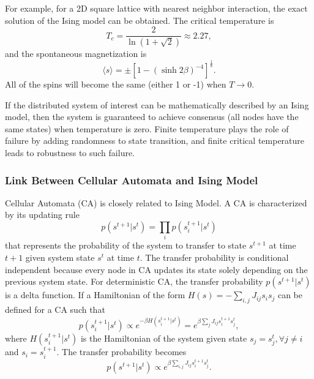 \documentclass[reprint,pre,aps]{revtex4-1}
\begin{document}
For example, for a 2D square lattice with nearest neighbor interaction, the exact solution of the Ising model can be obtained. The critical temperature is
\begin{equation}
T_c = \frac{2}{\ln(1 + \sqrt{2})} \approx 2.27,
\end{equation}
and the spontaneous magnetization is
\begin{equation}
\langle s \rangle = \pm \left[ 1 - (\sinh{2\beta})^{-4} \right]^{\frac{1}{8}}.
\end{equation}
All of the spins will become the same (either 1 or -1) when $T \to 0$.

If the distributed system of interest can be mathematically described by an Ising model, then the system is guaranteed to achieve consensus (all nodes have the same states) when temperature is zero. Finite temperature plays the role of failure by adding randomness to state transition, and finite critical temperature leads to robustness to such failure.

\subsubsection{Link Between Cellular Automata and Ising Model}

Cellular Automata (CA) is closely related to Ising Model. A CA is characterized by its updating rule
\begin{equation}
p(s^{t+1} | s^t) = \prod_i p(s^{t+1}_i | s^t)
\end{equation}
that represents the probability of the system to transfer to state $s^{t+1}$ at time $t + 1$ given system state $s^t$ at time $t$. The transfer probability is conditional independent because every node in CA updates its state solely depending on the previous system state. For deterministic CA, the transfer probability $p(s^{t+1} | s^t)$ is a delta function. If a Hamiltonian of the form $H(s) = -\sum_{i,j} J_{ij} s_i s_j$ can be defined for a CA such that
\begin{equation}
p(s^{t+1}_i | s^t) \propto e^{-\beta H(s^{t+1}_i | s^t)} = e^{\beta \sum_j J_{ij} s^{t+1}_i s^t_j},
\end{equation}
where $H(s^{t+1}_i | s^t)$ is the Hamiltonian of the system given state $s_j = s^t_j, \forall j \neq i$ and $s_i = s^{t+1}_i$. The transfer probability becomes
\begin{equation}
p(s^{t+1} | s^t) \propto e^{\beta \sum_{i,j} J_{ij} s^{t+1}_i s^t_j}.
\end{equation}
\end{document}
